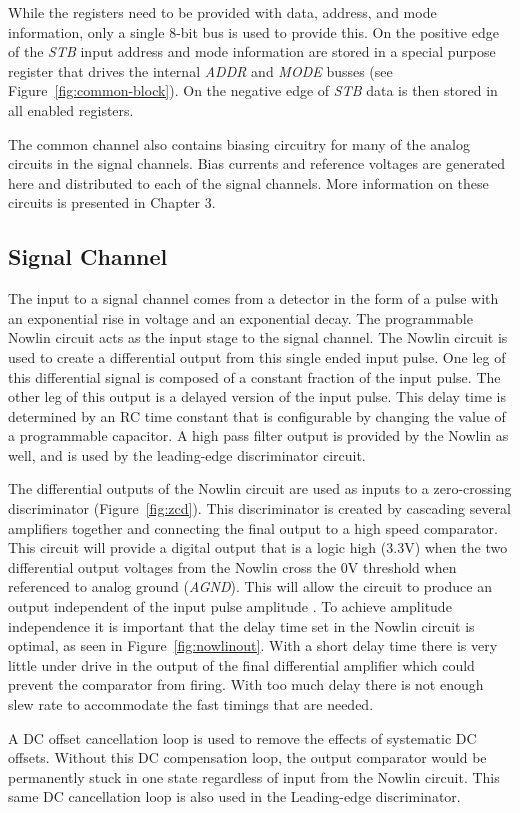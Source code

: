\documentclass[12pt,oneside,final]{siuethesis}
\theoremstyle{definition}
\begin{document}
\par While the registers need to be provided with data, address, and mode information, only a single 8-bit bus is used to provide this. On the positive edge of the \emph{STB} input address and mode information are stored in a special purpose register that drives the internal \emph{ADDR} and \emph{MODE} busses (see Figure~\ref{fig:common-block}). On the negative edge of \emph{STB} data is then stored in all enabled registers.
\par The common channel also contains biasing circuitry for many of the analog circuits in the signal channels. Bias currents and reference voltages are generated here and distributed to each of the signal channels. More information on these circuits is presented in Chapter 3.

\subsection{Signal Channel}
\par The input to a signal channel comes from a detector in the form of a pulse with an exponential rise in voltage and an exponential decay. The programmable Nowlin circuit acts as the input stage to the signal channel. The Nowlin circuit is used to create a differential output from this single ended input pulse. One leg of this differential signal is composed of a constant fraction of the input pulse. The other leg of this output is a delayed version of the input pulse. This delay time is determined by an RC time constant that is configurable by changing the value of a programmable capacitor. A high pass filter output is provided by the Nowlin as well, and is used by the leading-edge discriminator circuit.
\par The differential outputs of the Nowlin circuit are used as inputs to a zero-crossing discriminator (Figure~\ref{fig:zcd}). This discriminator is created by cascading several amplifiers together and connecting the final output to a high speed comparator. This circuit will provide a digital output that is a logic high (3.3V) when the two differential output voltages from the Nowlin cross the 0V threshold when referenced to analog ground (\emph{AGND}). This will allow the circuit to produce an output independent of the input pulse amplitude \cite{CFD}. To achieve amplitude independence it is important that the delay time set in the Nowlin circuit is optimal, as seen in Figure~\ref{fig:nowlinout}. With a short delay time there is very little under drive in the output of the final differential amplifier which could prevent the comparator from firing. With too much delay there is not enough slew rate to accommodate the fast timings that are needed.
\par A DC offset cancellation loop is used to remove the effects of systematic DC offsets. Without this DC compensation loop, the output comparator would be permanently stuck in one state regardless of input from the Nowlin circuit. This same DC cancellation loop is also used in the Leading-edge discriminator.
\end{document}

